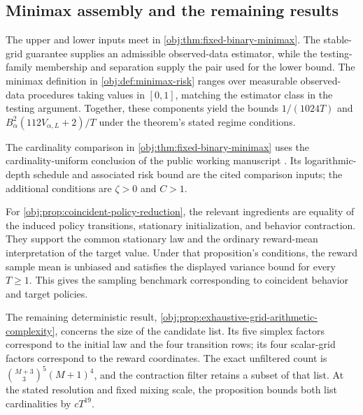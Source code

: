 \documentclass[11pt]{article}
\begin{document}
\subsection{Minimax assembly and the remaining results}

The upper and lower inputs meet in \cref{obj:thm:fixed-binary-minimax}. The stable-grid guarantee supplies an admissible observed-data estimator, while the testing-family membership and separation supply the pair used for the lower bound. The minimax definition in \cref{obj:def:minimax-risk} ranges over measurable observed-data procedures taking values in \([0,1]\), matching the estimator class in the testing argument. Together, these components yield the bounds \(1/(1024T)\) and \(B_\alpha^2(112V_{\alpha,L}+2)/T\) under the theorem's stated regime conditions.

The cardinality comparison in \cref{obj:thm:fixed-binary-minimax} uses the cardinality-uniform conclusion of the public working manuscript \citet[Theorem 1 (Uniform overlap frontier) and the Signed-depth family definition]{CausalSmithLatentOverlap2026}. Its logarithmic-depth schedule and associated risk bound are the cited comparison inputs; the additional conditions are \(\zeta>0\) and \(C>1\).

For \cref{obj:prop:coincident-policy-reduction}, the relevant ingredients are equality of the induced policy transitions, stationary initialization, and behavior contraction. They support the common stationary law and the ordinary reward-mean interpretation of the target value. Under that proposition's conditions, the reward sample mean is unbiased and satisfies the displayed variance bound for every \(T\geq1\). This gives the sampling benchmark corresponding to coincident behavior and target policies.

The remaining deterministic result, \cref{obj:prop:exhaustive-grid-arithmetic-complexity}, concerns the size of the candidate list. Its five simplex factors correspond to the initial law and the four transition rows; its four scalar-grid factors correspond to the reward coordinates. The exact unfiltered count is \(\binom{M+3}{3}^{5}(M+1)^4\), and the contraction filter retains a subset of that list. At the stated resolution and fixed mixing scale, the proposition bounds both list cardinalities by \(cT^{19}\).
\end{document}
